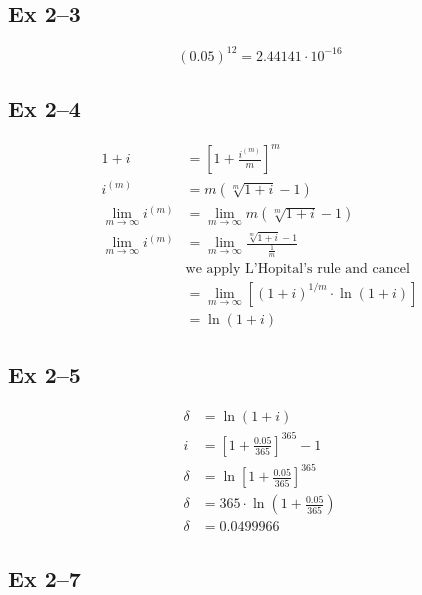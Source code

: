 \documentclass[a4paper, 12pt, reqno]{amsart}
\numberwithin{equation}{section}
\begin{document}
\subsection*{Ex 2--3}

$$(0.05)^{12} = 2.44141 \cdot 10^{-16}$$

\subsection*{Ex 2--4}

\begin{equation}\nonumber
    \begin{aligned}
        1 + i &= \left[ 1 + \frac{i^{(m)}}{m} \right]^m                 \\
        i^{(m)} &= m\left(\sqrt[m]{1+i} - 1\right)                      \\
        \lim_{m \rightarrow \infty}i^{(m)} &= 
            \lim_{m\rightarrow\infty}m\left(\sqrt[m]{1+i} - 1\right)    \\
        \lim_{m \rightarrow \infty}i^{(m)} &= 
            \lim_{m\rightarrow\infty}\frac{\sqrt[m]{1+i} - 1}{\frac{1}{m}}  \\
        &\text{we apply L'Hopital's rule and cancel}       \\
        &= \lim_{m\rightarrow\infty}\left[(1+i)^{1/m}\cdot\ln(1+i)\right]  \\
        &= \ln(1+i)
    \end{aligned}
\end{equation}

\subsection*{Ex 2--5}

\begin{equation}\nonumber
    \begin{aligned}
        \delta &= \ln(1+i)                                  \\
        i &= \left[1+\frac{0.05}{365}\right]^{365}-1        \\
        \delta &= \ln\left[1+\frac{0.05}{365}\right]^{365}        \\
        \delta &= 365 \cdot \ln\left(1 + \frac{0.05}{365}\right)    \\
        \delta &= 0.0499966
    \end{aligned}
\end{equation}

\subsection*{Ex 2--7}
\end{document}

